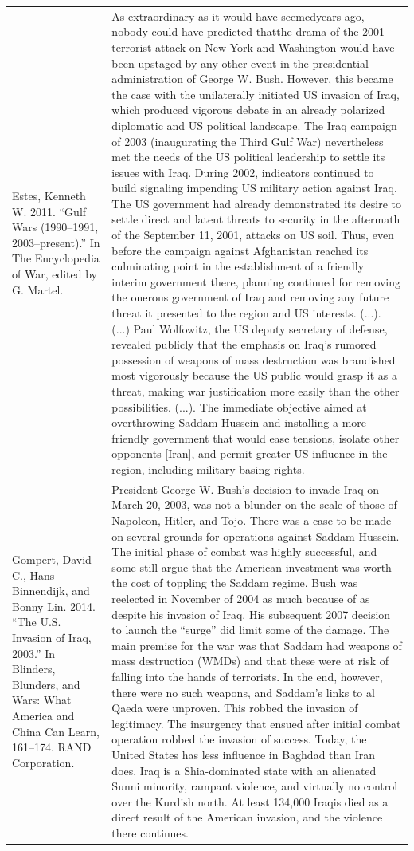 {\begin{longtable}{p{}p{}}
\\
Estes, Kenneth W. 2011. “Gulf Wars (1990–1991, 2003–present).” In The Encyclopedia of War, edited by G. Martel. & As extraordinary as it would have seemedyears ago, nobody could have predicted thatthe drama of the 2001 terrorist attack on New York and Washington would have been upstaged by any other event in the presidential administration of George W. Bush. However, this became the case with the unilaterally initiated US invasion of Iraq, which produced vigorous debate in an already polarized diplomatic and US political landscape. The Iraq campaign of 2003 (inaugurating the Third Gulf War) nevertheless met the needs of the US political leadership to settle its issues with Iraq. During 2002, indicators continued to build signaling impending US military action against Iraq. The US government had already demonstrated its desire to settle direct and latent threats to security in the aftermath of the September 11, 2001, attacks on US soil. Thus, even before the campaign against Afghanistan reached its culminating point in the establishment of a friendly interim government there, planning continued for removing the onerous government of Iraq and removing any future threat it presented to the region and US interests. (...). (...) Paul Wolfowitz, the US deputy secretary of defense, revealed publicly that the emphasis on Iraq's rumored possession of weapons of mass destruction was brandished most vigorously because the US public would grasp it as a threat, making war justification more easily than the other possibilities. (...). The immediate objective aimed at overthrowing Saddam Hussein and installing a more friendly government that would ease tensions, isolate other opponents [Iran], and permit greater US influence in the region, including military basing rights.
\\
Gompert, David C., Hans Binnendijk, and Bonny Lin. 2014. “The U.S. Invasion of Iraq, 2003.” In Blinders, Blunders, and Wars: What America and China Can Learn, 161–174. RAND Corporation. & President George W. Bush's decision to invade Iraq on March 20, 2003, was not a blunder on the scale of those of Napoleon, Hitler, and Tojo. There was a case to be made on several grounds for operations against Saddam Hussein. The initial phase of combat was highly successful, and some still argue that the American investment was worth the cost of toppling the Saddam regime. Bush was reelected in November of 2004 as much because of as despite his invasion of Iraq. His subsequent 2007 decision to launch the “surge” did limit some of the damage. The main premise for the war was that Saddam had weapons of mass destruction (WMDs) and that these were at risk of falling into the hands of terrorists. In the end, however, there were no such weapons, and Saddam's links to al Qaeda were unproven. This robbed the invasion of legitimacy. The insurgency that ensued after initial combat operation robbed the invasion of success. Today, the United States has less influence in Baghdad than Iran does. Iraq is a Shia-dominated state with an alienated Sunni minority, rampant violence, and virtually no control over the Kurdish north. At least 134,000 Iraqis died as a direct result of the American invasion, and the violence there continues.

\end{longtable}}
